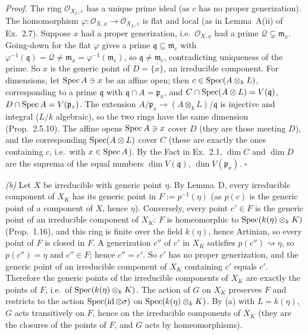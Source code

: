 \documentclass[11pt]{article}
\begin{document}
\emph{Proof.} The ring $\mathcal O_{X_L,c}$ has a unique prime ideal (as $c$ has no proper generization). The homomorphism $\varphi:\mathcal O_{X,x}\to\mathcal O_{X_L,c}$ is flat and local (as in Lemma~A(ii) of Ex.~2.7). Suppose $x$ had a proper generization, i.e.\ $\mathcal O_{X,x}$ had a prime $\mathcal Q\subsetneq\mathfrak m_x$. Going-down for the flat $\varphi$ gives a prime $\mathfrak q\subseteq\mathfrak m_c$ with $\varphi^{-1}(\mathfrak q)=\mathcal Q\neq\mathfrak m_x=\varphi^{-1}(\mathfrak m_c)$, so $\mathfrak q\ne\mathfrak m_c$, contradicting uniqueness of the prime. So $x$ is the generic point of $D=\overline{\{x\}}$, an irreducible component. For dimensions, let $\operatorname{Spec} A\ni x$ be an affine open; then $c\in\operatorname{Spec}(A\otimes_kL)$, corresponding to a prime $\mathfrak q$ with $\mathfrak q\cap A=\mathfrak p_x$, and $C\cap\operatorname{Spec}(A\otimes L)=V(\mathfrak q)$, $D\cap\operatorname{Spec} A=V(\mathfrak p_x)$. The extension $A/\mathfrak p_x\to(A\otimes_kL)/\mathfrak q$ is injective and integral ($L/k$ algebraic), so the two rings have the same dimension (Prop.~2.5.10). The affine opens $\operatorname{Spec} A\ni x$ cover $D$ (they are those meeting $D$), and the corresponding $\operatorname{Spec}(A\otimes L)$ cover $C$ (these are exactly the ones containing $c$, i.e.\ with $x\in\operatorname{Spec} A$). By the Fact in Ex.~2.1, $\dim C$ and $\dim D$ are the suprema of the equal numbers $\dim V(\mathfrak q)$, $\dim V(\mathfrak p_x)$. \hfill$\square$

\emph{(b)} Let $X$ be irreducible with generic point $\eta$. By Lemma~D, every irreducible component of $X_K$ has its generic point in $F:=p^{-1}(\eta)$ (as $p(c)$ is the generic point of a component of $X$, hence $\eta$). Conversely, every point $c'\in F$ is the generic point of an irreducible component of $X_K$: $F$ is homeomorphic to $\operatorname{Spec}(k(\eta)\otimes_kK)$ (Prop.~1.16), and this ring is finite over the field $k(\eta)$, hence Artinian, so every point of $F$ is closed in $F$. A generization $c''$ of $c'$ in $X_K$ satisfies $p(c'')\rightsquigarrow\eta$, so $p(c'')=\eta$ and $c''\in F$; hence $c''=c'$. So $c'$ has no proper generization, and the generic point of an irreducible component of $X_K$ containing $c'$ equals $c'$. Therefore the generic points of the irreducible components of $X_K$ are exactly the points of $F$, i.e.\ of $\operatorname{Spec}(k(\eta)\otimes_kK)$. The action of $G$ on $X_K$ preserves $F$ and restricts to the action $\operatorname{Spec}(\operatorname{id}\otimes\sigma)$ on $\operatorname{Spec}(k(\eta)\otimes_kK)$. By (a) with $L=k(\eta)$, $G$ acts transitively on $F$, hence on the irreducible components of $X_K$ (they are the closures of the points of $F$, and $G$ acts by homeomorphisms).
\end{document}
